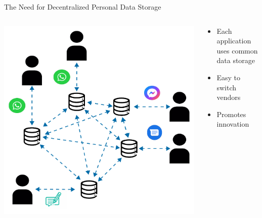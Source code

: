 \begin{frame}{The Need for Decentralized Personal Data Storage}
    \begin{columns}[T] %
        \begin{column}{0.6\textwidth} %
            \includegraphics[width=.9\linewidth]{images/decentralized-message-storage.pdf} %
        \end{column}

        \begin{column}{0.4\textwidth} %
            \begin{itemize}
                \item Each application uses common data storage
                \item Easy to switch vendors
                \item Promotes innovation
            \end{itemize}
        \end{column}
    \end{columns}
\end{frame}

